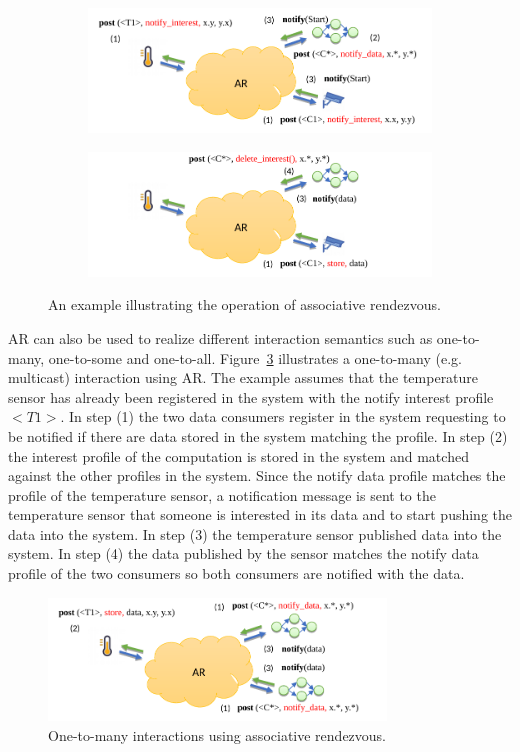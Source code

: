 \begin{figure}[h]
\centering
\begin{subfigure}[b]{0.8\textwidth}
   \includegraphics[width=1.1\linewidth]{Figures/AR_Exmple_1.pdf}
   \caption{}
\end{subfigure}
\begin{subfigure}[b]{0.8\textwidth}
   \includegraphics[width=1.1\linewidth]{Figures/AR_Example_2.pdf}
   \caption{}\label{fig:ARExample2} 
\end{subfigure}
\caption{An example illustrating the operation of associative rendezvous.}\label{fig:ARExample} 
\end{figure}

AR can also be used to realize different interaction semantics such as one-to-many, one-to-some and one-to-all. Figure~\ref{fig:AR-Multi} illustrates a one-to-many (e.g. multicast) interaction using AR. The example assumes that the temperature sensor has already been registered in the system with the notify interest profile $<T1>$. In step (1) the two data consumers register in the system requesting to be notified if there are data stored in the system matching the profile. In step (2) the interest profile of the computation is stored in the system and matched against the other profiles in the system. Since the notify data profile matches the profile of the temperature sensor, a notification message is sent to the temperature sensor that someone is interested in its data and to start pushing the data into the system. In step (3) the temperature sensor published data into the system. In step (4) the data published by the sensor matches the notify data profile of the two consumers so both consumers are notified with the data.

\begin{figure}[h!]
  \centering
  \includegraphics[width=0.8\textwidth]{Figures/AR_Example_Multi.pdf}
  \caption{One-to-many interactions using associative rendezvous.}
  \label{fig:AR-Multi}
\end{figure}